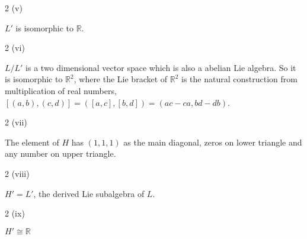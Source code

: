 \documentclass[10pt]{article}
\theoremstyle{plain}
\theoremstyle{definition}
\newenvironment{problem_hw}[1]{{\noindent\bfseries Problem #1.}}{}
\newenvironment{answer_hw}{{\noindent\em Answer.}}{}
\newcommand{\IR}{\mathbb{R}}
\newcommand{\<}{\langle}
\renewcommand{\>}{\rangle}
\begin{document}
\begin{problem_hw}{2 (v)}
\end{problem_hw}

\begin{answer_hw}

$L'$ is isomorphic to $\IR$.\\

\end{answer_hw}

\begin{problem_hw}{2 (vi)}
\end{problem_hw}

\begin{answer_hw}

$L/L'$ is a two dimensional vector space which is also a abelian Lie algebra. So it is isomorphic to $\IR^2$, where the Lie bracket of $\IR^2$ is the natural construction from multiplication of real numbers, $[(a,b), (c,d)]= ([a,c],[b,d]) = (ac-ca,bd-db)$. \\

\end{answer_hw}

\begin{problem_hw}{2 (vii)}
\end{problem_hw}

\begin{answer_hw}

The element of $H$ has $(1,1,1)$ as the main diagonal, zeros on lower triangle and any number on upper triangle.\\

\end{answer_hw}

\begin{problem_hw}{2 (viii)}
\end{problem_hw}

\begin{answer_hw}

$H' = L'$, the derived Lie subalgebra of $L$. \\

\end{answer_hw}

\begin{problem_hw}{2 (ix)}
\end{problem_hw}

\begin{answer_hw}
$H' \cong \IR$ \\

\end{answer_hw}
\end{document}
